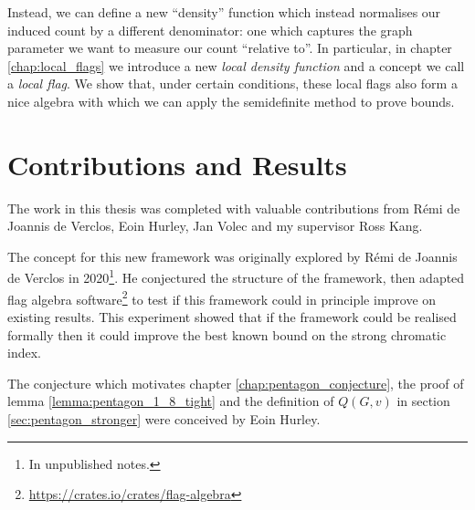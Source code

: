 Instead, we can define a new ``density'' function which instead normalises our induced
count by a different denominator: one which captures the graph parameter we want to measure
our count ``relative to''. In particular, in chapter \ref{chap:local_flags} we introduce a
new \textit{local density function} and a concept we call a \textit{local flag}.
We show that, under certain conditions, these local flags also form a nice algebra
with which we can apply the semidefinite method to prove bounds.

\section*{Contributions and Results}

The work in this thesis was completed with valuable contributions from Rémi de Joannis de Verclos,
Eoin Hurley, Jan Volec and my supervisor Ross Kang.

The concept for this new framework was originally explored by Rémi de Joannis de Verclos in
2020\footnote{In unpublished notes.}.
He conjectured the structure of the framework, then adapted flag algebra
software\footnote{\url{https://crates.io/crates/flag-algebra}}
to test if this framework could in principle improve on existing results.
This experiment showed that if the framework could be realised formally then it could improve the
best known bound on the strong chromatic index.

The conjecture which motivates chapter \ref{chap:pentagon_conjecture}, the
proof of lemma \ref{lemma:pentagon_1_8_tight} and the definition of $Q(G,v)$ in
section \ref{sec:pentagon_stronger} were conceived by Eoin Hurley.

\hfill

